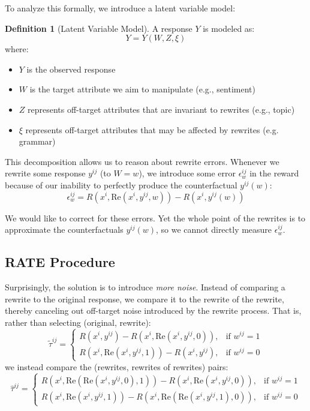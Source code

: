 \documentclass{article}
\theoremstyle{definition}
\newtheorem{definition}[theorem]{Definition}
\begin{document}
To analyze this formally, we introduce a latent variable model:

\begin{definition}[Latent Variable Model]
A response $Y$ is modeled as:
\[ Y = Y(W, Z, \xi) \]
where:
\begin{itemize}
    \item $Y$ is the observed response
    \item $W$ is the target attribute we aim to manipulate (e.g., sentiment)
    \item $Z$ represents off-target attributes that are invariant to rewrites (e.g., topic)
    \item $\xi$ represents off-target attributes that may be affected by rewrites (e.g. grammar)
\end{itemize}
\end{definition}

This decomposition allows us to reason about rewrite errors. Whenever we rewrite some response $y^{ij}$ (to $W = w$), we introduce some error $\epsilon^{ij}_w$ in the reward because of our inability to perfectly produce the counterfactual $y^{ij}(w)$:
  \[\epsilon^{ij}_w = R(x^i, \text{Re}(x^i, y^{ij}, w)) - R(x^i, y^{ij}(w)) \]

We would like to correct for these errors. Yet the whole point of the rewrites is to approximate the counterfactuals $y^{ij}(w)$, so we cannot directly measure $\epsilon^{ij}_w$.

\subsection{RATE Procedure}
Surprisingly, the solution is to introduce \emph{more noise}. Instead of comparing a rewrite to the original response, we compare it to the rewrite of the rewrite, thereby canceling out off-target noise introduced by the rewrite process. That is, rather than selecting (original, rewrite):
\[
\tilde{\tau}^{ij} = 
\begin{cases}
  R(x^i, y^{ij}) - R(x^i, \text{Re}(x^i, y^{ij}, 0)), & \text{if } w^{ij} = 1 \\
  R(x^i, \text{Re}(x^i, y^{ij}, 1)) - R(x^i, y^{ij}), & \text{if } w^{ij} = 0
\end{cases}
\]
we instead compare the (rewrites, rewrites of rewrites) pairs:
\[
\hat{\tau}^{ij} = 
\begin{cases}
  R(x^i, \text{Re}(\text{Re}(x^i, y^{ij}, 0), 1)) - R(x^i, \text{Re}(x^i, y^{ij}, 0)), & \text{if } w^{ij} = 1 \\
  R(x^i, \text{Re}(x^i, y^{ij}, 1)) - R(x^i, \text{Re}(\text{Re}(x^i, y^{ij}, 1), 0)), & \text{if } w^{ij} = 0
\end{cases}
\]
\end{document}
